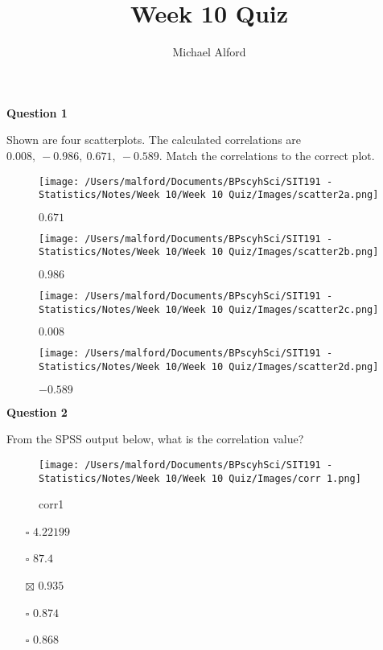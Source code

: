 \documentclass[
]{article}
\title{Week 10 Quiz}
\author{Michael Alford}
\date{}
\providecommand{\tightlist}{%
  \setlength{\itemsep}{0pt}\setlength{\parskip}{0pt}}
\begin{document}
\maketitle

\textbf{Question 1}

Shown are four scatterplots. The calculated correlations are
\(0.008,\ -0.986,\ 0.671,\ -0.589\). Match the correlations to the
correct plot.

\begin{figure}
\centering
\texttt{[image: /Users/malford/Documents/BPscyhSci/SIT191 - Statistics/Notes/Week 10/Week 10 Quiz/Images/scatter2a.png]}
\caption{\(0.671\)}
\end{figure}

\begin{figure}
\centering
\texttt{[image: /Users/malford/Documents/BPscyhSci/SIT191 - Statistics/Notes/Week 10/Week 10 Quiz/Images/scatter2b.png]}
\caption{\(0.986\)}
\end{figure}

\begin{figure}
\centering
\texttt{[image: /Users/malford/Documents/BPscyhSci/SIT191 - Statistics/Notes/Week 10/Week 10 Quiz/Images/scatter2c.png]}
\caption{\(0.008\)}
\end{figure}

\begin{figure}
\centering
\texttt{[image: /Users/malford/Documents/BPscyhSci/SIT191 - Statistics/Notes/Week 10/Week 10 Quiz/Images/scatter2d.png]}
\caption{\(-0.589\)}
\end{figure}

\textbf{Question 2}

From the SPSS output below, what is the correlation value?

\begin{figure}
\centering
\texttt{[image: /Users/malford/Documents/BPscyhSci/SIT191 - Statistics/Notes/Week 10/Week 10 Quiz/Images/corr 1.png]}
\caption{corr1}
\end{figure}

\begin{itemize}
\tightlist
\item[$\square$]
  \(4.22199\)
\item[$\square$]
  \(87.4%
  \)
\item[$\boxtimes$]
  \(0.935\)
\item[$\square$]
  \(0.874\)
\item[$\square$]
  \(0.868\)
\end{itemize}
\end{document}
